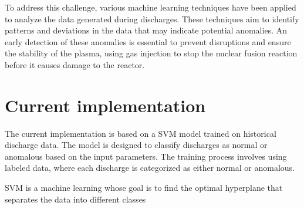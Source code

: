 To address this challenge, various machine learning techniques have been applied to analyze the data generated during discharges. These techniques aim to identify patterns and deviations in the data that may indicate potential anomalies. An early detection of these anomalies is essential to prevent disruptions and ensure the stability of the plasma, using gas injection to stop the nuclear fusion reaction before it causes damage to the reactor.

\section{Current implementation}

The current implementation is based on a \ac{SVM} model trained on historical discharge data. The model is designed to classify discharges as normal or anomalous based on the input parameters. The training process involves using labeled data, where each discharge is categorized as either normal or anomalous.

\ac{SVM} is a machine learning whose goal is to find the optimal hyperplane that separates the data into different classes \autocite{6524743}
